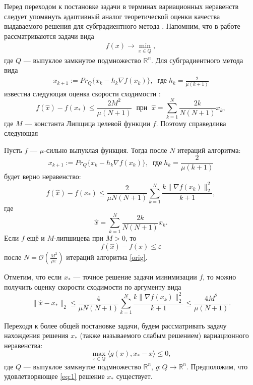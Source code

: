 Перед переходом к постановке задачи в терминах вариационных неравенств следует упомянуть адаптивный аналог \cite{Stonyakin_2021} теоретической оценки качества выдаваемого решения для субградиентного метода \cite{Bach_2012}. Напомним, что в работе рассматриваются задачи вида
\begin{gather}\label{min_q}
    f(x)\rightarrow\min_{x\in Q},
\end{gather}
где $Q$ --- выпуклое замкнутое подмножество $\mathbb{R}^{n}$. Для субградиентного метода вида
\begin{gather}\label{orig}
    x_{k+1} := Pr_{Q}\{x_k - h_k \nabla f(x_k) \}, \;\; \textit{где} \; h_k = \frac{2}{\mu (k+1)}
\end{gather}
известна следующая оценка скорости сходимости \cite{Bach_2012}:
\begin{equation}\label{orig_estimation_f}
    f(\widehat{x}) - f(x_*) \leq \frac{2 M^2}{\mu (N+1)}  \; \text{  при   } \; \widehat{x} = \sum\limits_{k=1}^{N} \frac{2 k}{N (N+1)} x_k, 
\end{equation}
где $M$ --- константа Липщица целевой функции $f$.
Поэтому справедлива следующая
\begin{theorem}\label{ThmBachAdaptive}
    Пусть $f$ --- $\mu$-сильно выпуклая функция. Тогда после $N$ итераций алгоритма:
    $$
        x_{k+1} := Pr_{Q}\{x_k - h_k \nabla f(x_k) \}, \;\; \textit{где} \; h_k = \frac{2}{\mu (k+1)}
    $$
    будет верно неравенство:
    \begin{equation}\label{adaptive_estimation_f}
        f(\widehat{x}) - f(x_*) \leq \frac{2}{\mu N (N+1)} \sum_{k=1}^{N} \frac{k \|\nabla f(x_k)\|_2^2}{k+1},
    \end{equation}
    где
    $$
        \widehat{x} = \sum_{k=1}^{N} \frac{2 k}{N (N+1)} x_k.
    $$
    Если $f$ ещё и $M$-липшицева при $M >0$, то
    $$
         f(\widehat{x}) - f(x) \leq \varepsilon
    $$
    после $N = \mathcal{O}(\frac{M^2}{\mu\varepsilon})$ итераций алгоритма \eqref{orig}.
\end{theorem}

Отметим, что если $x_*$ --- точное решение задачи минимизации $f$, то можно получить оценку скорости сходимости по аргументу вида
\begin{equation} \label{arg_est}
    \|\widehat{x} - x_*\|_2 \leq \frac{4}{\mu N (N+1)} \sum_{k=1}^{N} \frac{k \|\nabla f(x_k)\|_2^2}{k+1} \leq \frac{4M^2}{\mu(N+1)}.
\end{equation}

Переходя к более общей постановке задачи, будем рассматривать задачу нахождения решения $x_*$ (также называемого слабым решением) вариационного неравенства: 
\begin{equation}\label{eq:1}
\max_{x \in Q} \langle g(x), x_* - x \rangle \leq 0,
\end{equation}
где $Q$ --- выпуклое замкнутое подмножество $\mathbb{R}^n$,
$g: Q \longrightarrow \mathbb{R}^n$. Предположим, что удовлетворяющее \eqref{eq:1} решение $x_*$ существует.


